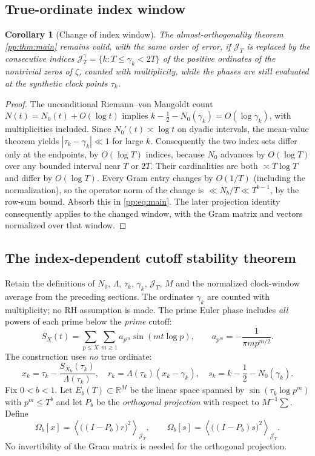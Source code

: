 \documentclass[11pt,reqno]{amsart}
\numberwithin{equation}{section}
\newtheorem{corollary}[theorem]{Corollary}
\newcommand{\R}{\mathbb R}
\newcommand{\lamb}{\Lambda}
\newcommand{\avgJ}[1]{\left\langle #1\right\rangle_{\mathcal J_T}}
\begin{document}
\subsection{True-ordinate index window}
\begin{corollary}[Change of index window]\label{pp:cor:zeros}
The almost-orthogonality theorem \ref{pp:thm:main} remains valid, with the same order of error, if $\mathcal J_T$ is replaced by the consecutive indices $\mathcal J_T^\gamma=\{k:T\le\gamma_k<2T\}$ of the positive ordinates of the nontrivial zeros of $\zeta$, counted with multiplicity, while the phases are \emph{still evaluated at the synthetic clock points} $\tau_k$.
\end{corollary}
\begin{proof}
The unconditional Riemann--von Mangoldt count $N(t)=N_0(t)+O(\log t)$ implies $k-\tfrac12-N_0(\gamma_k)=O(\log\gamma_k)$, with multiplicities included. Since $N_0'(t)\asymp\log t$ on dyadic intervals, the mean-value theorem yields $|\tau_k-\gamma_k|\ll1$ for large $k$. Consequently the two index sets differ only at the endpoints, by $O(\log T)$ indices, because $N_0$ advances by $O(\log T)$ over any bounded interval near $T$ or $2T$. Their cardinalities are both $\asymp T\log T$ and differ by $O(\log T)$. Every Gram entry changes by $O(1/T)$ (including the normalization), so the operator norm of the change is $\ll N_b/T\ll T^{b-1}$, by the row-sum bound. Absorb this in \eqref{pp:eq:main}. The later projection identity consequently applies to the changed window, with the Gram matrix and vectors normalized over that window.
\end{proof}


\subsection{The index-dependent cutoff stability theorem}
Retain the definitions of $N_0$, $\lamb$, $\tau_k$, $\gamma_k$, $\mathcal J_T$, $M$ and the normalized clock-window average from the preceding sections. The ordinates $\gamma_k$ are counted with multiplicity; no RH assumption is made.
The prime Euler phase includes \emph{all} powers of each prime below the \emph{prime} cutoff:
\begin{equation}
S_X(t)=\sum_{p\le X}\sum_{m\ge1} a_{p^m}\sin(mt\log p),
\qquad a_{p^m}=-\frac1{\pi m p^{m/2}}.
\label{ov:eq:fullphase}
\end{equation}
The construction uses \emph{no} true ordinate:
\begin{equation}
x_k=\tau_k-\frac{S_{X_k}(\tau_k)}{\lamb(\tau_k)},
\quad r_k=\lamb(\tau_k)(x_k-\gamma_k),
\quad s_k=k-\frac12-N_0(\gamma_k).
\label{ov:eq:construct}
\end{equation}
Fix $0<b<1$. Let $E_b(T)\subset\R^M$ be the linear space spanned by $\sin(\tau_k\log p^m)$ with $p^m\le T^b$ and let $P_b$ be the \emph{orthogonal projection} with respect to $M^{-1}\sum$. Define
\begin{equation}
\Omega_b[x]=\avgJ{\bigl((I-P_b)r\bigr)^2},\qquad
\Omega_b[s]=\avgJ{\bigl((I-P_b)s\bigr)^2}.
\label{ov:eq:Omega}
\end{equation}
No invertibility of the Gram matrix is needed for the orthogonal projection.
\end{document}
